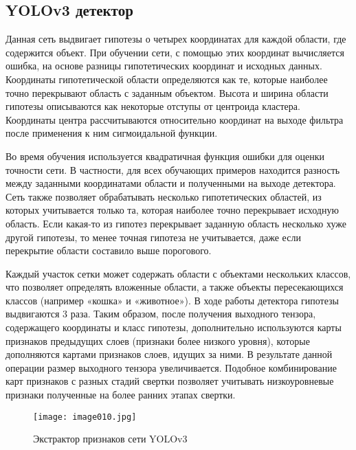 \subsection{YOLOv3 детектор}

Данная сеть выдвигает гипотезы о четырех координатах для каждой области, где содержится объект. При обучении сети, с помощью этих координат вычисляется ошибка, на основе разницы гипотетических координат и исходных данных. Координаты гипотетической области определяются как те, которые наиболее точно перекрывают область с заданным объектом. Высота и ширина области гипотезы описываются как некоторые отступы от центроида кластера. Координаты центра рассчитываются относительно координат на выходе фильтра после применения к ним сигмоидальной функции.

Во время обучения используется квадратичная функция ошибки для оценки точности сети. В частности, для всех обучающих примеров находится разность между заданными координатами области и полученными на выходе детектора. Сеть также позволяет обрабатывать несколько гипотетических областей, из которых учитывается только та, которая наиболее точно перекрывает исходную область. Если какая-то из гипотез перекрывает заданную область несколько хуже другой гипотезы, то менее точная гипотеза не учитывается, даже если перекрытие области составило выше порогового. 

Каждый участок сетки может содержать области с объектами нескольких классов, что позволяет определять вложенные области, а также объекты пересекающихся классов (например «кошка» и «животное»). В ходе работы детектора гипотезы выдвигаются 3 раза. Таким образом, после получения выходного тензора, содержащего координаты и класс гипотезы, дополнительно используются карты признаков предыдущих слоев (признаки более низкого уровня), которые дополняются картами признаков слоев, идущих за ними. В результате данной операции размер выходного тензора увеличивается. Подобное комбинирование карт признаков с разных стадий свертки позволяет учитывать низкоуровневые признаки полученные на более ранних этапах свертки. 

\begin{figure}[htbp]
\centering
\texttt{[image: image010.jpg]}
\caption{Экстрактор признаков сети YOLOv3~\cite{thirteen}}%
\label{fig:how-to-do-research}
\end{figure}

